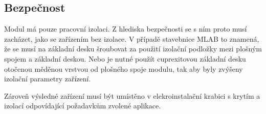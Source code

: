 \documentclass[12pt,a4paper,oneside]{article}
\begin{document}
\subsection{Bezpečnost}

Modul má pouze pracovní izolaci. Z hlediska bezpečnosti se s ním proto musí zacházet, jako se zařízením bez izolace. V případě stavebnice MLAB to znamená, že se musí na základní desku šroubovat za použití izolační podložky mezi plošným spojem a základní deskou. Nebo je nutné použít cuprexitovou základní desku otočenou měděnou vrstvou od plošného spoje modulu, tak aby byly zvýšeny izolační parametry zařízení. 

Zároveň výsledné zařízení musí být umístěno v elekroinstalační krabici s krytím a izolací odpovídající požadavkům zvolené aplikace. 
\end{document}
